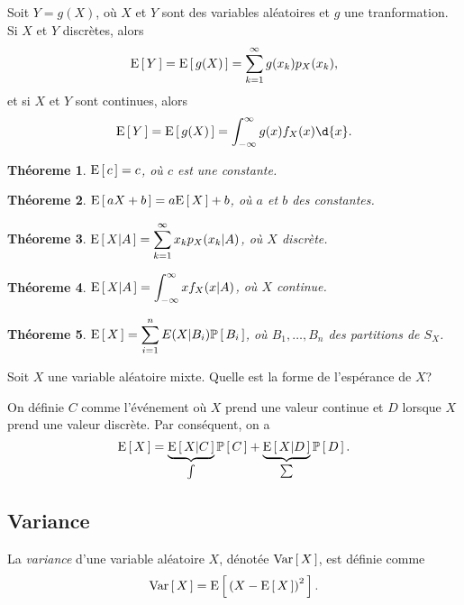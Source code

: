\documentclass[11pt]{article}
\renewcommand\P[1]{%
	\ensuremath{%
		\mathbb{P}\left[\,#1\,\right]%
	}%
}%
\newcommand\Esp[1]{%
	\ensuremath{%
		\mathrm{E}\left[\,#1\,\right]%
	}%
}%
\newcommand\Espg[2]{%
	\ensuremath{%
		\mathrm{E}\left[\,#1\middle\vert#2\,\right]%
	}%
}%
\newcommand\Var[1]{%
	\ensuremath{%
		\mathrm{Var}\left[\,#1\,\right]%
	}%
}%
\newtheorem{theoreme}{Théoreme}[section]
\begin{document}
Soit $Y=g(X)$, où $X$ et $Y$ sont des variables aléatoires et $g$ une
tranformation. Si $X$ et $Y$ discrètes, alors
\begin{equation*}
	\Esp{Y}=\Esp{g(X)}=\sum_{k=1}^\infty g(x_k)p_X(x_k),
\end{equation*}
et si $X$ et $Y$ sont continues, alors
\begin{equation*}
	\Esp{Y}=\Esp{g(X)}=\int_{-\infty}^\infty g(x)f_X(x)\d{x}.
\end{equation*}

\begin{theoreme}
	$\Esp{c}=c$, où $c$ est une constante.
\end{theoreme}

\begin{theoreme}
	$\Esp{aX+b}=a\Esp{X}+b$, où $a$ et $b$ des constantes.
\end{theoreme}

\begin{theoreme}
	$\Espg{X}{A}=\displaystyle\sum_{k=1}^\infty x_kp_X(x_k|A)$, où $X$ discrète.
\end{theoreme}

\begin{theoreme}
	$\Espg{X}{A}=\displaystyle\int_{-\infty}^\infty xf_X(x|A)$, où $X$ continue.
\end{theoreme}

\begin{theoreme}
	$\Esp{X}=\displaystyle\sum_{i=1}^nE(X|B_i)\P{B_i}$, où $B_1,\dots,B_n$ des
	partitions de $S_X$.
\end{theoreme}

\begin{exemple}
	Soit $X$ une variable aléatoire mixte. Quelle est la forme de l'espérance
	de $X$?

	On définie $C$ comme l'événement où $X$ prend une valeur continue et $D$
	lorsque $X$ prend une valeur discrète. Par conséquent, on a
	\begin{equation*}
		\Esp{X}=\underbrace{\Espg{X}{C}}_{\int}\P{C}
		+\underbrace{\Espg{X}{D}}_{\sum}\P{D}.
	\end{equation*}
\end{exemple}

\subsection{Variance}
\begin{definition}
	La \textit{variance} d'une variable aléatoire $X$, dénotée $\Var{X}$, est
	définie comme
	\begin{equation*}
		\Var{X}=\Esp{\left(X-\Esp{X}\right)^2}.
	\end{equation*}
\end{definition}
\end{document}
